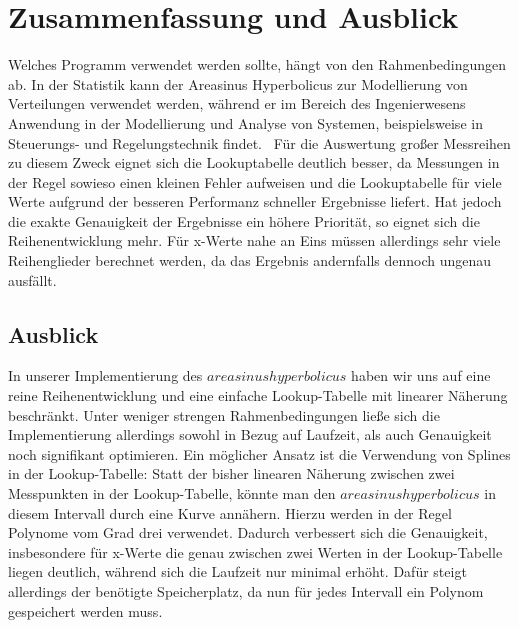 \documentclass[course=erap] {aspdoc}
\begin{document}
    \section{Zusammenfassung und Ausblick}
    Welches Programm verwendet werden sollte, hängt von den Rahmenbedingungen ab.
    In der Statistik kann der Areasinus Hyperbolicus zur Modellierung von Verteilungen verwendet werden, während er im Bereich des Ingenierwesens
    Anwendung in der Modellierung und Analyse von Systemen, beispielsweise in Steuerungs- und Regelungstechnik findet.~\cite{TODO}
    Für die Auswertung großer Messreihen zu diesem Zweck eignet sich die Lookuptabelle deutlich besser, da Messungen in der Regel sowieso einen kleinen Fehler aufweisen und die Lookuptabelle für viele Werte aufgrund der besseren Performanz schneller Ergebnisse liefert.
    Hat jedoch die exakte Genauigkeit der Ergebnisse ein höhere Priorität, so eignet sich die Reihenentwicklung mehr.
    Für x-Werte nahe an Eins müssen allerdings sehr viele Reihenglieder berechnet werden, da das Ergebnis andernfalls dennoch ungenau ausfällt.

    \subsection{Ausblick}

    In unserer Implementierung des $areasinus hyperbolicus$ haben wir uns auf eine reine Reihenentwicklung und eine einfache Lookup-Tabelle mit linearer Näherung beschränkt.
    Unter weniger strengen Rahmenbedingungen ließe sich die Implementierung allerdings sowohl in Bezug auf Laufzeit, als auch Genauigkeit noch signifikant optimieren.
    Ein möglicher Ansatz ist die Verwendung von Splines in der Lookup-Tabelle: Statt der bisher linearen Näherung zwischen zwei Messpunkten in der Lookup-Tabelle, könnte man den $areasinus hyperbolicus$ in diesem Intervall durch eine Kurve annähern.
    Hierzu werden in der Regel Polynome vom Grad drei verwendet.
    Dadurch verbessert sich die Genauigkeit, insbesondere für x-Werte die genau zwischen zwei Werten in der Lookup-Tabelle liegen deutlich, während sich die Laufzeit nur minimal erhöht.
    Dafür steigt allerdings der benötigte Speicherplatz, da nun für jedes Intervall ein Polynom gespeichert werden muss.
\end{document}
